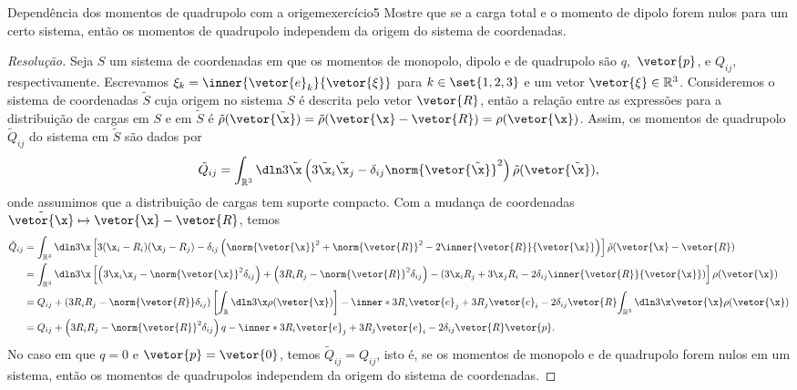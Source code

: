 \begin{exercício}{Dependência dos momentos de quadrupolo com a origem}{exercício5}
    Mostre que se a carga total e o momento de dipolo forem nulos para um certo sistema, então os momentos de quadrupolo independem da origem do sistema de coordenadas.
\end{exercício}
\begin{proof}[Resolução]
    Seja \(S\) um sistema de coordenadas em que os momentos de monopolo, dipolo e de quadrupolo são \(q,\) \(\vetor{p}\), e \(Q_{ij}\), respectivamente. Escrevamos \(\xi_k = \inner{\vetor{e}_k}{\vetor{\xi}}\) para \(k \in \set{1,2,3}\) e um vetor \(\vetor{\xi} \in \mathbb{R}^3\). Consideremos o sistema de coordenadas \(\tilde{S}\) cuja origem no sistema \(S\) é descrita pelo vetor \(\vetor{R}\), então a relação entre as expressões para a distribuição de cargas  em \(S\) e em \(\tilde{S}\) é \(\tilde{\rho}(\vetor{\tilde{\x}}) = \tilde{\rho}(\vetor{\x} - \vetor{R}) = \rho(\vetor{\x})\). Assim, os momentos de quadrupolo \(\tilde{Q}_{ij}\) do sistema em \(\tilde{S}\) são dados por
    \begin{equation*}
        \tilde{Q}_{ij} = \int_{\mathbb{R}^3} \dln3{\tilde{\x}} \left(3 \tilde{\x}_i \tilde{\x}_j - \delta_{ij} \norm{\vetor{\tilde{\x}}}^2\right) \tilde{\rho}(\vetor{\tilde{\x}}),
    \end{equation*}
    onde assumimos que a distribuição de cargas tem suporte compacto. Com a mudança de coordenadas \(\tilde{\vetor{\x}} \mapsto \vetor{\x} - \vetor{R}\), temos
    \begin{align*}
        \tilde{Q}_{ij} &= \int_{\mathbb{R}^3} \dln3\x \left[3 (\x_i - R_i)(\x_j - R_j) - \delta_{ij} \left(\norm{\vetor{\x}}^2 + \norm{\vetor{R}}^2 - 2 \inner{\vetor{R}}{\vetor{\x}}\right)\right] \tilde{\rho}(\vetor{\x} - \vetor{R})\\
                       &= \int_{\mathbb{R}^3} \dln3\x \left[\left(3\x_i \x_j - \norm{\vetor{\x}}^2 \delta_{ij}\right) + \left(3R_i R_j - \norm{\vetor{R}}^2 \delta_{ij}\right) - \left(3\x_i R_j + 3\x_j R_i - 2\delta_{ij}\inner{\vetor{R}}{\vetor{\x}}\right)\right]\rho(\vetor{\x})\\
                       &= Q_{ij}+ \left(3 R_i R_j - \norm{\vetor{R}} \delta_{ij}\right)\left[\int_{\mathbb{R}} \dln3\x \rho(\vetor{\x})\right] - \inner*{3R_i\vetor{e}_j + 3R_j\vetor{e}_i - 2 \delta_{ij} \vetor{R}}{\int_{\mathbb{R}^3}\dln3\x \vetor{\x} \rho(\vetor{\x})}\\
                       &= Q_{ij} + \left(3R_i R_j - \norm{\vetor{R}}^2 \delta_{ij}\right)q - \inner*{3R_i \vetor{e}_j + 3 R_j \vetor{e}_i - 2 \delta_{ij} \vetor{R}}{\vetor{p}}.
    \end{align*}
    No caso em que \(q = 0\) e \(\vetor{p} = \vetor{0}\), temos \(\tilde{Q}_{ij} = Q_{ij}\), isto é, se os momentos de monopolo e de quadrupolo forem nulos em um sistema, então os momentos de quadrupolos independem da origem do sistema de coordenadas.
\end{proof}
